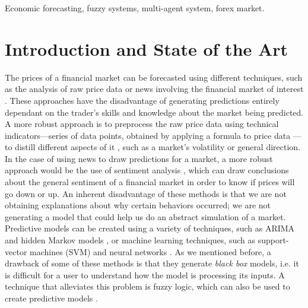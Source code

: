 \documentclass{ieeeaccess}
\begin{document}
\begin{keywords}
  Economic forecasting, fuzzy systems, multi-agent system, forex market.
\end{keywords}

\titlepgskip=-15pt

\maketitle

\section{Introduction and State of the Art}
\label{section:introduction}

The prices of a financial market can be forecasted using different
techniques, such as the analysis of raw price data or news involving
the financial market of interest \cite{Liu2019}. These approaches have
the disadvantage of generating predictions
entirely dependant on the trader's skills and knowledge about the
market being predicted.
A more robust approach is to preprocess the raw price data using
technical indicators---series of data points, obtained by applying a
formula to price data \cite{fernandez2008technical}---to distill
different aspects of it \cite{Alsubaie2019}, such as a market's
volatility or general direction. In the case of using news to draw
predictions for a market, a more robust approach would be the use of
sentiment analysis \cite{LienMinh2018}
\cite{Cabrera2018}, which can draw conclusions about the general
sentiment of a financial market in order to know if prices will go
down or up. An inherent disadvantage of these methods is that we are not 
obtaining explanations about why certain behaviors occurred; we
are not generating a model that could help us do an abstract
simulation of a market. Predictive models can be created using a variety of
techniques, such as ARIMA \cite{Idrees2019} and hidden Markov models
\cite{Cao2019}, or machine learning techniques, such as support-vector
machines (SVM) \cite{Guo2018} and neural networks \cite{Chen2019a}. As
we mentioned before, a drawback of some of these methods is that they generate \textit{black
box} models, i.e. it is difficult for a user to understand how the
model is processing its inputs. A technique that alleviates this
problem is fuzzy logic, which can also be used to create predictive
models \cite{Jiang2018} \cite{Sang2019} \cite{Chourmouziadis2019}.
\end{document}
